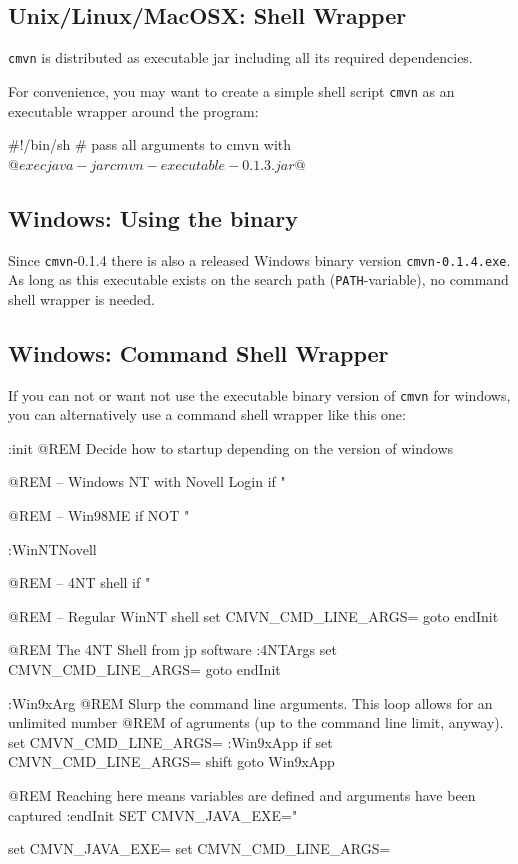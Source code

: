 \documentclass[a4paper,12pt,english,oneside,halfparskip]{scrartcl}
\newcommand{\cmvn}{\texttt{cmvn}}
\newcommand{\code}[1]{\texttt{#1}}
\begin{document}
\subsection{Unix/Linux/MacOSX: Shell Wrapper}

\cmvn{} is distributed as executable jar including all its required dependencies. 

For convenience, you may want to create a simple shell script \code{cmvn} as an executable wrapper around the program:

\begin{Cmdline}[caption={Shell wrapper: \code{mvu}}]
#!/bin/sh
# pass all arguments to cmvn with $@
exec java -jar cmvn-executable-0.1.3.jar $@
\end{Cmdline}

\subsection{Windows: Using the binary}

Since \cmvn{}-0.1.4 there is also a released Windows binary version \code{cmvn-0.1.4.exe}. As long as this executable exists on the search path (\code{PATH}-variable), no command shell wrapper is needed.

\subsection{Windows: Command Shell Wrapper}

If you can not or want not use the executable binary version of \cmvn{} for windows, you can alternatively use a command shell wrapper like this one:

\begin{Cmdline}[caption={Windows Command Shell wrapper: \code{cmvn.bat}}]
:init
@REM Decide how to startup depending on the version of windows

@REM -- Windows NT with Novell Login
if "%

@REM -- Win98ME
if NOT "%

:WinNTNovell

@REM -- 4NT shell
if "%

@REM -- Regular WinNT shell
set CMVN_CMD_LINE_ARGS=%
goto endInit

@REM The 4NT Shell from jp software
:4NTArgs
set CMVN_CMD_LINE_ARGS=%
goto endInit

:Win9xArg
@REM Slurp the command line arguments.  This loop allows for an unlimited number
@REM of agruments (up to the command line limit, anyway).
set CMVN_CMD_LINE_ARGS=
:Win9xApp
if %
set CMVN_CMD_LINE_ARGS=%
shift
goto Win9xApp

@REM Reaching here means variables are defined and arguments have been captured
:endInit
SET CMVN_JAVA_EXE="%


set CMVN_JAVA_EXE=
set CMVN_CMD_LINE_ARGS=
\end{Cmdline}
\end{document}
